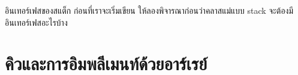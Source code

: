 \begin{quiz}{อิน{\wbr}เทอร์เฟส{\wbr}ของ{\wbr}สแต็ก}
ก่อน{\wbr}ที่{\wbr}เรา{\wbr}จะ{\wbr}เริ่ม{\wbr}เขียน ให้{\wbr}ลอง{\wbr}พิจารณา{\wbr}ก่อน{\wbr}ว่า{\wbr}ค{\wbr}ลา{\wbr}ส{\wbr}แม่แบบ {\ct stack} จะ{\wbr}ต้อง{\wbr}มี{\wbr}อิน{\wbr}เทอร์เฟส{\wbr}อะไร{\wbr}บ้าง{\wbr}
\end{quiz}



\section{คิว{\wbr}และ{\wbr}การ{\wbr}อิม{\wbr}พลี{\wbr}เมนท์{\wbr}ด้วย{\wbr}อาร์เรย์}

